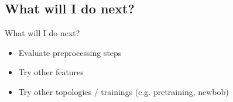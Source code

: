 \subsection{What will I do next?}
\begin{frame}{What will I do next?}
    \begin{itemize}
        \item Evaluate preprocessing steps
        \item Try other features
        \item Try other topologies / trainings (e.g. pretraining, newbob)
    \end{itemize}
\end{frame}

